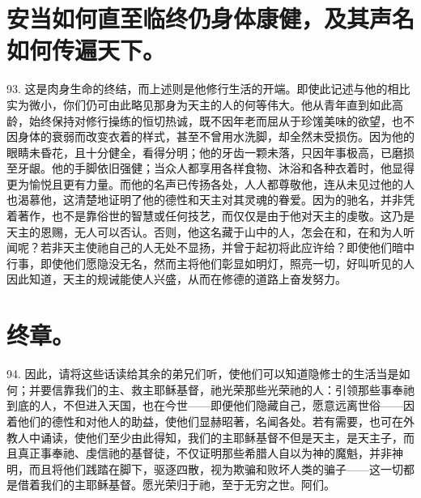 
\section{安当如何直至临终仍身体康健，及其声名如何传遍天下。}

93. 这是肉身生命的终结，而上述则是他修行生活的开端。即使此记述与他的相比实为微小，你们仍可由此略见那身为天主的人的何等伟大。他从青年直到如此高龄，始终保持对修行操练的恒切热诚，既不因年老而屈从于珍馐美味的欲望，也不因身体的衰弱而改变衣着的样式，甚至不曾用水洗脚，却全然未受损伤。因为他的眼睛未昏花，且十分健全，看得分明；他的牙齿一颗未落，只因年事极高，已磨损至牙龈。他的手脚依旧强健；当众人都享用各样食物、沐浴和各种衣着时，他显得更为愉悦且更有力量。而他的名声已传扬各处，人人都尊敬他，连从未见过他的人也渴慕他，这清楚地证明了他的德性和天主对其灵魂的眷爱。因为的驰名，并非凭着著作，也不是靠俗世的智慧或任何技艺，而仅仅是由于他对天主的虔敬。这乃是天主的恩赐，无人可以否认。否则，他这名藏于山中的人，怎会在和，在和为人听闻呢？若非天主使祂自己的人无处不显扬，并曾于起初将此应许给？即使他们暗中行事，即使他们愿隐没无名，然而主将他们彰显如明灯，照亮一切，好叫听见的人因此知道，天主的规诫能使人兴盛，从而在修德的道路上奋发努力。\par


\section{终章。}

94. 因此，请将这些话读给其余的弟兄们听，使他们可以知道隐修士的生活当是如何；并要信靠我们的主、救主耶稣基督，祂光荣那些光荣祂的人：引领那些事奉祂到底的人，不但进入天国，也在今世——即便他们隐藏自己，愿意远离世俗——因着他们的德性和对他人的助益，使他们显赫昭著，名闻各处。若有需要，也可在外教人中诵读，使他们至少由此得知，我们的主耶稣基督不但是天主，是天主子，而且真正事奉祂、虔信祂的基督徒，不仅证明那些希腊人自以为神的魔魁，并非神明，而且将他们践踏在脚下，驱逐四散，视为欺骗和败坏人类的骗子——这一切都是借着我们的主耶稣基督。愿光荣归于祂，至于无穷之世。阿们。\par

